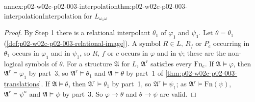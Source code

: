 \begin{annexitem}{annex:p02-w02c-p02-003-interpolation}{thm:p02-w02c-p02-003-interpolation}{Interpolation for \(L_{\omega_1\omega}\)}
\begin{proof}
By Step 1 there is a relational interpolant \(\theta_1\) of \(\varphi_1\)
and \(\psi_1\).  Let \(\theta=\theta_1^{-}\)
(\cref{def:p02-w02c-p02-003-relational-image}).  A symbol \(R\in L\),
\(R_f\) or \(P_c\) occurring in \(\theta_1\) occurs in \(\varphi_1\) and in
\(\psi_1\), so \(R\), \(f\) or \(c\) occurs in \(\varphi\) and in \(\psi\);
these are the non-logical symbols of \(\theta\).  For a structure
\(\mathfrak A\) for \(L\), \(\mathfrak A^{r}\) satisfies every
\(\mathrm{Fn}_e\).  If \(\mathfrak A\models\varphi\), then
\(\mathfrak A^{r}\models\varphi_1\) by part~3, so
\(\mathfrak A^{r}\models\theta_1\) and \(\mathfrak A\models\theta\) by
part~1 of \cref{thm:p02-w02c-p02-003-translations}.  If
\(\mathfrak A\models\theta\), then \(\mathfrak A^{r}\models\theta_1\) by
part~1, so \(\mathfrak A^{r}\models\psi_1\); as
\(\mathfrak A^{r}\models\mathrm{Fn}(\psi)\), \(\mathfrak
A^{r}\models\psi^{u}\) and \(\mathfrak A\models\psi\) by part~3.  So
\(\varphi\to\theta\) and \(\theta\to\psi\) are valid.
\end{proof}
\end{annexitem}

